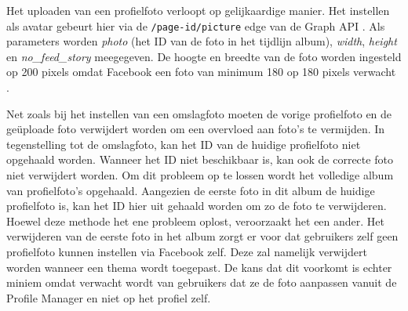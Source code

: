 Het uploaden van een profielfoto verloopt op gelijkaardige manier. Het instellen als avatar gebeurt hier via de \texttt{/page-id/picture} edge van de Graph API \cite{FacebookPagePicture}. Als parameters worden \textit{photo} (het ID van de foto in het tijdlijn album), \textit{width}, \textit{height} en \textit{no{\_}feed{\_}story} meegegeven. De hoogte en breedte van de foto worden ingesteld op 200 pixels omdat Facebook een foto van minimum 180 op 180 pixels verwacht \cite{FacebookDimensions}. 

Net zoals bij het instellen van een omslagfoto moeten de vorige profielfoto en de ge\"{u}ploade foto verwijdert worden om een overvloed aan foto's te vermijden. In tegenstelling tot de omslagfoto, kan het ID van de huidige profielfoto niet opgehaald worden. Wanneer het ID niet beschikbaar is, kan ook de correcte foto niet verwijdert worden. Om dit probleem op te lossen wordt het volledige album van profielfoto's opgehaald. Aangezien de eerste foto in dit album de huidige profielfoto is, kan het ID hier uit gehaald worden om zo de foto te verwijderen. Hoewel deze methode het ene probleem oplost, veroorzaakt het een ander. Het verwijderen van de eerste foto in het album zorgt er voor dat gebruikers zelf geen profielfoto kunnen instellen via Facebook zelf. Deze zal namelijk verwijdert worden wanneer een thema wordt toegepast. De kans dat dit voorkomt is echter miniem omdat verwacht wordt van gebruikers dat ze de foto aanpassen vanuit de Profile Manager en niet op het profiel zelf. 

